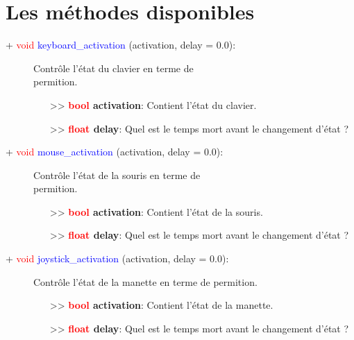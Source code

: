 \documentclass[a4paper, 11pt]{article}
\begin{document}
	\section{Les méthodes disponibles}
	\begin{description}
		\item [+ \textcolor{red}{void} \textcolor{blue}{keyboard\_activation} (activation, delay = 0.0):] 
		Contrôle l'état du clavier en terme de \\permition.
		\begin{itemize}
			\item [>> \textbf{\textcolor{red}{bool} activation}:] Contient l'état du clavier.
			\item [>> \textbf{\textcolor{red}{float} delay}:] Quel est le temps mort avant le changement 
			d'état ?\\
		\end{itemize}
	\end{description}
	\newpage \begin{description}
		\item [+ \textcolor{red}{void} \textcolor{blue}{mouse\_activation} (activation, delay = 0.0):] 
		Contrôle l'état de la souris en terme de \\permition.
		\begin{itemize}
			\item [>> \textbf{\textcolor{red}{bool} activation}:] Contient l'état de la souris.
			\item [>> \textbf{\textcolor{red}{float} delay}:] Quel est le temps mort avant le changement 
			d'état ?\\
		\end{itemize}
	\end{description}
	\begin{description}
		\item [+ \textcolor{red}{void} \textcolor{blue}{joystick\_activation} (activation, delay = 0.0):] 
		Contrôle l'état de la manette en terme de permition.
		\begin{itemize}
			\item [>> \textbf{\textcolor{red}{bool} activation}:] Contient l'état de la manette.
			\item [>> \textbf{\textcolor{red}{float} delay}:] Quel est le temps mort avant le changement 
			d'état ?\\
		\end{itemize}
	\end{description}
\end{document}
